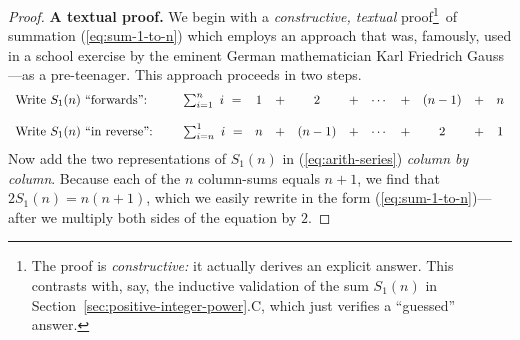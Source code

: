  
\begin{proof}
{\bf A textual proof.}
We begin with a {\em constructive, textual} proof\footnote{The proof is {\em constructive:} it actually derives an explicit answer.  This contrasts with, say, the inductive validation of the sum $S_1(n)$ in Section~\ref{sec:positive-integer-power}.C, which just verifies a ``guessed'' answer.}~of summation (\ref{eq:sum-1-to-n}) which employs an approach that was, famously,  used in a school exercise by the eminent German mathematician Karl Friedrich Gauss---as a pre-teenager.  This approach proceeds in two steps.
\begin{equation}
\label{eq:arith-series}
\begin{array}{llccccccccc}
\mbox{Write $S_1(n)$ ``forwards'':} &
\hspace*{.2in}\sum_{i=1}^n \ i \ = & 1 & + & 2   & + & \cdots & + & (n-1) & + & n \\
 & & & & & & & & & &  \\
\mbox{Write $S_1(n)$ ``in reverse'':} &
\hspace*{.2in}\sum_{i=n}^1 \ i \ = & n & + & (n-1) & + & \cdots & + & 2   & + & 1
\end{array}
\end{equation}
Now add the two representations of $S_1(n)$ in (\ref{eq:arith-series})
{\em column by column}.  Because each of the $n$ column-sums equals $n+1$, we find that $2 S_1(n) = n(n+1)$, which we easily rewrite in the form (\ref{eq:sum-1-to-n})---after we multiply both sides of the equation by $2$.
\end{proof}

\medskip
\noindent {}

